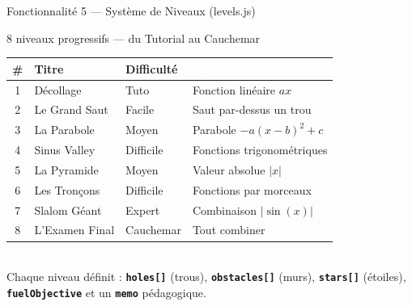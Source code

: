 \documentclass[aspectratio=169,12pt]{beamer}
\newcommand{\tech}[1]{\textcolor{mycyan}{\textbf{\texttt{#1}}}}
\begin{document}
\begin{frame}{Fonctionnalit\'e 5 --- Syst\`eme de Niveaux (levels.js)}
  \begin{block}{8 niveaux progressifs --- du Tutorial au Cauchemar}
  \end{block}
  \begin{tabular}{clll}
    \toprule
    \textcolor{mycyan}{\#} & \textcolor{myyellow}{Titre} & \textcolor{mylightslate}{Difficult\'e} & \textcolor{white}{Concept math\'ematique}\\
    \midrule
    1 & D\'ecollage & Tuto & Fonction lin\'eaire $ax$\\
    2 & Le Grand Saut & Facile & Saut par-dessus un trou\\
    3 & La Parabole & Moyen & Parabole $-a(x-b)^2+c$\\
    4 & Sinus Valley & Difficile & Fonctions trigonom\'etriques\\
    5 & La Pyramide & Moyen & Valeur absolue $|x|$\\
    6 & Les Tron\c{c}ons & Difficile & Fonctions par morceaux\\
    7 & Slalom G\'eant & Expert & Combinaison $|\sin(x)|$\\
    8 & L'Examen Final & Cauchemar & Tout combiner\\
    \bottomrule
  \end{tabular}
  \vspace{0.2cm}\\
  Chaque niveau d\'efinit : \tech{holes[]} (trous), \tech{obstacles[]} (murs),
  \tech{stars[]} (\'etoiles), \tech{fuelObjective} et un \tech{memo} p\'edagogique.
\end{frame}
\end{document}
